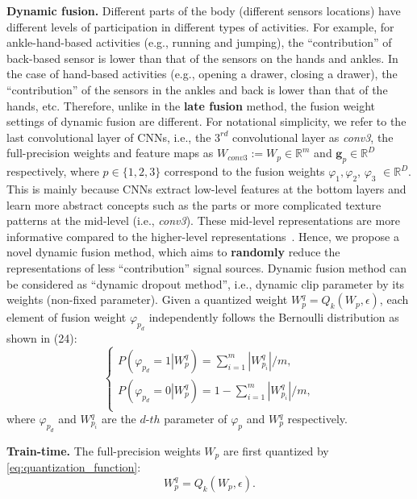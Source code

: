 \documentclass[twoside,twocolumn]{article}
\begin{document}
\textbf{Dynamic fusion.} Different parts of the body (different sensors locations) have different levels of participation in different types of activities. For example, for ankle-hand-based activities (e.g., running and jumping), the ``contribution'' of back-based sensor is lower than that of the sensors on the hands and ankles. In the case of hand-based activities (e.g., opening a drawer, closing a drawer), the ``contribution'' of the sensors in the ankles and back is lower than that of the hands, etc. Therefore, unlike in the \textbf{late fusion} method, the fusion weight settings of dynamic fusion are different. For notational simplicity, we refer to the last convolutional layer of CNNs, i.e., the $3^{rd}$ convolutional layer as \emph{conv3}, the full-precision weights and feature maps as $W_{conv3}:=W_p\in \mathbb{R}^m$ and $\boldsymbol{g}_p\in \mathbb{R}^D$ respectively, where $p\in{\{1,2,3\}}$ correspond to the fusion weights $\varphi_1, \varphi_2$, $\varphi_3$ $\in \mathbb{R}^D$. This is mainly because CNNs extract low-level features at the bottom layers and learn more abstract concepts such as the parts or more complicated texture patterns at the mid-level (i.e., \emph{conv3}). These mid-level representations are more informative compared to the higher-level representations~\cite{b46}. Hence, we propose a novel dynamic fusion method, which aims to \textbf{randomly} reduce the representations of less ``contribution'' signal sources. Dynamic fusion method can be considered as ``dynamic dropout method'', i.e., dynamic clip parameter by its weights (non-fixed parameter). Given a quantized weight $W_p^q=Q_{k}\left( W_p,\epsilon\right)$, each element of fusion weight $\varphi_{p_d}$ independently follows the Bernoulli distribution as shown in (24):
\begin{equation}\label{eq:Bernoulli_distribution}
\begin{cases}
	P\left( \varphi _{p_d}=1\left| W_p^q \right. \right) = \sum_{i=1}^{m}{|W_{p_i}^q|}/ m,\\
	P\left( \varphi _{p_d}=0\left| W_p^q \right. \right) =1-\sum_{i=1}^{m}{|W_{p_i}^q|}/ m,\\
\end{cases}
\end{equation}
where $\varphi_{p_d}$ and $W_{p_i}^q$ are the $d$-$th$ parameter of $\varphi_p$ and $W_p^q$ respectively.

\noindent\textbf{Train-time.} The full-precision weights $W_p$ are first quantized by \eqref{eq:quantization_function}:
\begin{equation}\label{eq:full-precision-dynamic_fusion_train-time_quantization_step_1}
W_p^q=Q_k\left( W_p,\epsilon\right).
\end{equation}
\end{document}
